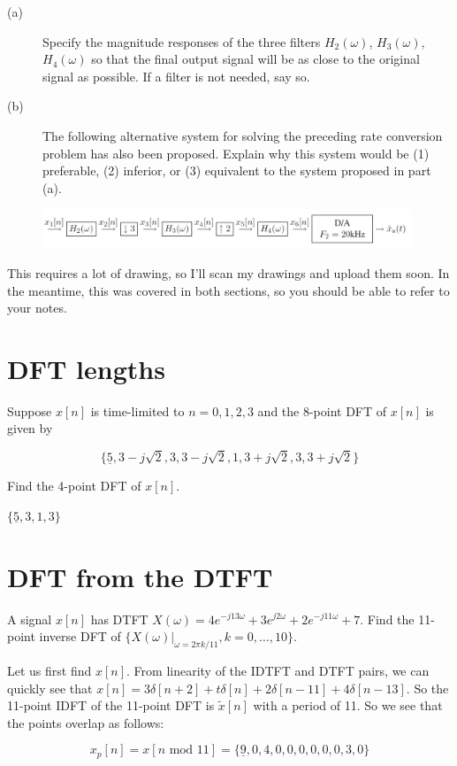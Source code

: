\documentclass[11pt]{article}
\begin{document}
\begin{description}
	\item[(a)] Specify the magnitude responses of the three filters $H_2(\omega)$, $H_3(\omega)$, $H_4(\omega)$ so that the final output signal will be as close to the original signal as possible. If a filter is not needed, say so.
	\item[(b)] The following alternative system for solving the preceding rate conversion problem has also been proposed. Explain why this system would be (1) preferable, (2) inferior, or (3) equivalent to the system proposed in part (a).
	
	\includegraphics[width = 0.9\textwidth]{rate_conv_b.png} 	
\end{description}

{\color{blue}
This requires a lot of drawing, so I'll scan my drawings and upload them soon. In the meantime, this was covered in both sections, so you should be able to refer to your notes.
}

\section{DFT lengths}

Suppose $x[n]$ is time-limited to $n=0,1, 2, 3$ and the 8-point DFT of $x[n]$ is given by

\[ \{\underline{5}, 3-j\sqrt{2}, 3, 3-j\sqrt{2}, 1, 3+j\sqrt{2}, 3, 3+j\sqrt{2} \} \]

Find the 4-point DFT of $x[n]$.

{\color{blue}
$\{\underline{5},3,1,3\}$
}

\section{DFT from the DTFT}

A signal $x[n]$ has DTFT $X(\omega) = 4e^{-j13 \omega} + 3e^{j2\omega} + 2e^{-j11\omega}+7$. Find the 11-point inverse DFT of $\{X(\omega)\big|_{\omega = 2 \pi k /11}, k = 0,\ldots, 10\}$.

{\color{blue}
Let us first find $x[n]$. From linearity of the IDTFT and DTFT pairs, we can quickly see that $x[n] = 3 \delta[n+2]+t\delta[n]+2\delta[n-11]+4\delta[n-13]$. So the 11-point IDFT of the 11-point DFT is $\tilde{x}[n]$ with a period of 11. So we see that the points overlap as follows:

\[x_p[n] = x[n\text{ mod } 11] = \{\underline{9},0,4,0,0,0,0,0,0,3,0\} \]
}
\end{document}
